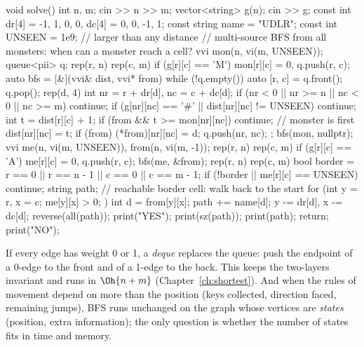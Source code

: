 \begin{code}
void solve() {
    int n, m;
    cin >> n >> m;
    vector<string> g(n);
    cin >> g;
    const int dr[4] = {-1, 1, 0, 0}, dc[4] = {0, 0, -1, 1};
    const string name = "UDLR";
    const int UNSEEN = 1e9;  // larger than any distance
    // multi-source BFS from all monsters: when can a monster reach a cell?
    vvi mon(n, vi(m, UNSEEN));
    queue<pii> q;
    rep(r, n) rep(c, m) if (g[r][c] == 'M') mon[r][c] = 0, q.push({r, c});
    auto bfs = [&](vvi& dist, vvi* from) {
        while (!q.empty()) {
            auto [r, c] = q.front();
            q.pop();
            rep(d, 4) {
                int nr = r + dr[d], nc = c + dc[d];
                if (nr < 0 || nr >= n || nc < 0 || nc >= m) continue;
                if (g[nr][nc] == '#' || dist[nr][nc] != UNSEEN) continue;
                int t = dist[r][c] + 1;
                if (from && t >= mon[nr][nc]) continue;  // monster is first
                dist[nr][nc] = t;
                if (from) (*from)[nr][nc] = d;
                q.push({nr, nc});
            }
        }
    };
    bfs(mon, nullptr);
    vvi me(n, vi(m, UNSEEN)), from(n, vi(m, -1));
    rep(r, n) rep(c, m) if (g[r][c] == 'A') me[r][c] = 0, q.push({r, c});
    bfs(me, &from);
    rep(r, n) rep(c, m) {
        bool border = r == 0 || r == n - 1 || c == 0 || c == m - 1;
        if (!border || me[r][c] == UNSEEN) continue;
        string path;  // reachable border cell: walk back to the start
        for (int y = r, x = c; me[y][x] > 0; ) {
            int d = from[y][x];
            path += name[d];
            y -= dr[d], x -= dc[d];
        }
        reverse(all(path));
        print("YES");
        print(sz(path));
        print(path);
        return;
    }
    print("NO");
}
\end{code}

\begin{trick}
If every edge has weight 0 or 1, a \emph{deque} replaces the queue: push the endpoint of a 0-edge to the front and of a
1-edge to the back. This  keeps the two-layers invariant and runs in $\Oh{n + m}$ (Chapter~\ref{ch:shortest}).
And when the rules of movement depend on more than the position (keys collected, direction faced, remaining jumps), BFS runs
unchanged on the graph whose vertices are \emph{states} (position, extra information); the only question is whether the
number of states fits in time and memory.
\end{trick}

